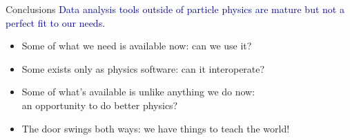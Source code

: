 \documentclass[aspectratio=169]{beamer}
\begin{document}
\begin{frame}{Conclusions}
\Large
\vspace{0.75 cm}
\textcolor{darkblue}{Data analysis tools outside of particle physics are mature but not a perfect fit to our needs.}

\vspace{0.35 cm}
\begin{itemize}\setlength{\itemsep}{0.35 cm}
\item Some of what we need is available now: can we use it?
\item Some exists only as physics software: can it interoperate?
\item Some of what's available is unlike anything we do now:\\an opportunity to do better physics?
\item<2-> The door swings both ways: we have things to teach the world!
\end{itemize}
\end{frame}
\end{document}

